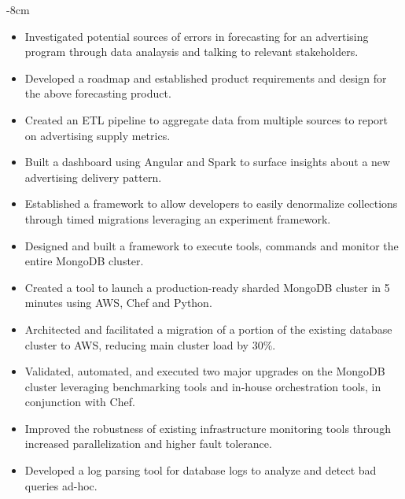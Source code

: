 \documentclass[10pt,a4paper,academicons]{altacv}
\begin{document}

\begin{adjustwidth}{}{-8cm}
\makecvheader
\end{adjustwidth}


\begin{itemize}
\item Investigated potential sources of errors in forecasting for an advertising program through data analaysis and talking to relevant stakeholders.
\item Developed a roadmap and established product requirements and design for the above forecasting product.
\item Created an ETL pipeline to aggregate data from multiple sources to report on advertising supply metrics.
\item Built a dashboard using Angular and Spark to surface insights about a new advertising delivery pattern.
\end{itemize}

\divider

\begin{itemize}
\item Established a framework to allow developers to easily denormalize collections through timed migrations leveraging an experiment framework.
\item Designed and built a framework to execute tools, commands and monitor the entire MongoDB cluster.
\item Created a tool to launch a production-ready sharded MongoDB cluster in 5
    minutes using AWS, Chef and Python.
\item Architected and facilitated a migration of a portion of the existing
    database cluster to AWS, reducing main cluster load by 30\%. 
\item Validated, automated, and executed two major upgrades on the MongoDB
    cluster leveraging benchmarking tools and in-house orchestration tools, in
        conjunction with Chef.
\item Improved the robustness of existing infrastructure monitoring tools through increased parallelization and higher fault tolerance.
\item Developed a log parsing tool for database logs to analyze and detect bad queries ad-hoc.
\end{itemize}
\end{document}

